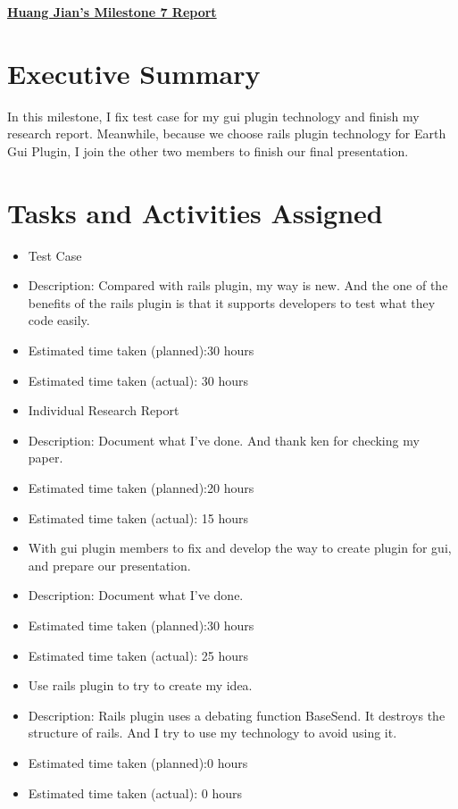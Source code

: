 \begin{center}
{\large\textbf{\underline{{Huang Jian's Milestone 7 Report}}}}
\end{center}

\section*{Executive Summary}
In this milestone, I fix test case for my gui plugin technology and finish my research report. Meanwhile, because we choose rails plugin technology for Earth Gui Plugin, I join the other two members to finish our final presentation.

\section*{Tasks and Activities Assigned}

\begin{itemize}
	\item Test Case
	\item Description: Compared with rails plugin, my way is new. And the one of the benefits of the rails plugin is that it supports developers to test what they code easily.
	\item Estimated time taken (planned):30 hours
	\item Estimated time taken (actual): 30 hours
\end{itemize}

\begin{itemize}
	\item Individual Research Report
	\item Description: Document what I've done. And thank ken for checking my paper.
	\item Estimated time taken (planned):20 hours
	\item Estimated time taken (actual): 15 hours
\end{itemize}

\begin{itemize}
	\item With gui plugin members to fix and develop the way to create plugin for gui, and prepare our presentation. 
	\item Description: Document what I've done.
	\item Estimated time taken (planned):30 hours
	\item Estimated time taken (actual): 25 hours
\end{itemize}

\begin{itemize}
	\item Use rails plugin to try to create my idea.
	\item Description: Rails plugin uses a debating function BaseSend. It destroys the structure of rails. And I try to use my technology to avoid using it.
	\item Estimated time taken (planned):0 hours
	\item Estimated time taken (actual): 0 hours
\end{itemize}

